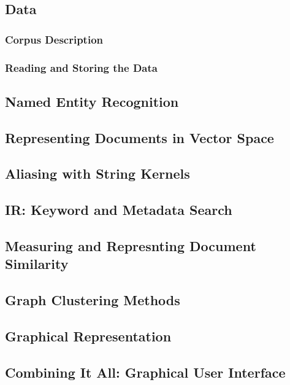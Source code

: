 \subsection{Data}\label{sec:data}
\subsubsection{Corpus Description}\label{sec:description_of_the_castro_archive}

\subsubsection{Reading and Storing the Data}\label{sec:reading_and_storing_the_data}

\subsection{Named Entity Recognition}\label{sec:stanford_named_entity_recognizer}


\subsection{Representing Documents in Vector Space}\label{sec:representing_documents_in_vector_space}


\subsection{Aliasing with String Kernels}\label{sec:aliasing}


\subsection{IR: Keyword and Metadata Search}\label{sec:aliasing}


\subsection{Measuring and Represnting Document Similarity}\label{sec:aliasing}


\subsection{Graph Clustering Methods}\label{sec:graph_clustering_methods}


\subsection{Graphical Representation}\label{sec:graphical_representation}


\subsection{Combining It All: Graphical User Interface}\label{sec:gui}


